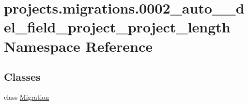 \hypertarget{namespaceprojects_1_1migrations_1_10002__auto____del__field__project__project__length}{\section{projects.\-migrations.0002\-\_\-auto\-\_\-\-\_\-del\-\_\-field\-\_\-project\-\_\-project\-\_\-length Namespace Reference}
\label{namespaceprojects_1_1migrations_1_10002__auto____del__field__project__project__length}
}
\subsection*{Classes}
\begin{DoxyCompactItemize}
\item 
class \hyperlink{classprojects_1_1migrations_1_10002__auto____del__field__project__project__length_1_1_migration}{Migration}
\end{DoxyCompactItemize}
